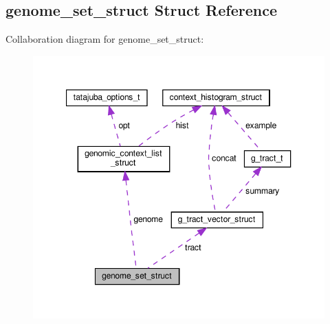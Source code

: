 \hypertarget{structgenome__set__struct}{}\subsection{genome\+\_\+set\+\_\+struct Struct Reference}
\label{structgenome__set__struct}


Collaboration diagram for genome\+\_\+set\+\_\+struct\+:\nopagebreak
\begin{figure}[H]
\begin{center}
\leavevmode
\includegraphics[width=347pt]{structgenome__set__struct__coll__graph}
\end{center}
\end{figure}
